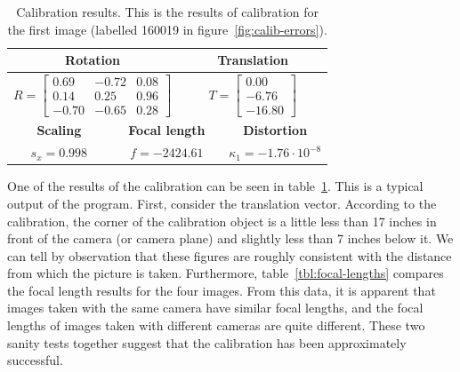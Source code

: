 \begin{table}[htb]
  \centering
  \begin{tabular}{c c c c c c}
    \toprule
    \multicolumn{3}{c}{\textbf{Rotation}} & \multicolumn{3}{c}{\textbf{Translation}}\\
    \midrule
    \multicolumn{3}{c}{$R=\begin{bmatrix}0.69 & -0.72 & 0.08\\
    0.14 & 0.25 & 0.96\\
    -0.70 & -0.65 & 0.28\end{bmatrix}$} &
    \multicolumn{3}{c}{$T=\begin{bmatrix}0.00\\-6.76\\-16.80\end{bmatrix}$} \\
    \midrule
    \multicolumn{2}{c}{\textbf{Scaling}} &
    \multicolumn{2}{c}{\textbf{Focal length}} &
    \multicolumn{2}{c}{\textbf{Distortion}}\\
    \midrule
    \multicolumn{2}{c}{$s_x =0.998$} &
    \multicolumn{2}{c}{$f=-2424.61$} &
    \multicolumn{2}{c}{$\kappa_1=-1.76 \cdot 10^{-8}$}\\
    \bottomrule
  \end{tabular}
  \caption[Calibration results]{Calibration results. This is the
    results of calibration for the first image (labelled 160019 in
    figure~\ref{fig:calib-errors}).}
  \label{tbl:calib-results}
\end{table}

One of the results of the calibration can be seen in
table~\ref{tbl:calib-results}. This is a typical output of the program. First, consider the translation vector. According to the calibration, the corner of the calibration object is
a little less than 17 inches in front of the camera (or camera plane) and slightly less than 7 inches below it. We can tell by observation that these figures are roughly consistent with the
distance from which the picture is taken. Furthermore, table~\ref{tbl:focal-lengths} compares the focal length results for the four images. From this data, it is
apparent that images taken with the same camera have similar focal
lengths, and the focal lengths of images taken with different cameras
are quite different. These two sanity tests together suggest that the calibration has been approximately successful.

